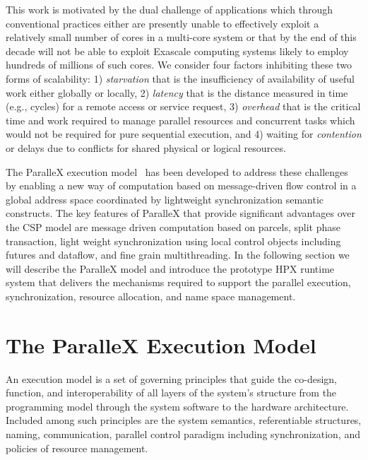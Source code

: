 \documentclass{revtex4}
\newcommand{\I}[1]{\textit{#1}}
\begin{document}
This work is motivated by the dual challenge of
applications which through conventional practices either are presently
unable to effectively exploit a relatively small number of cores in a
multi-core system or that by the end of this decade will not be able to
exploit Exascale computing systems likely to employ hundreds of millions
of such cores. We consider four factors inhibiting
these two forms of scalability: 1) \I{starvation} that is the insufficiency
of availability of useful work either globally or locally, 2) \I{latency}
that is the distance measured in time (e.g., cycles) for a remote access
or service request, 3) \I{overhead} that is the critical time and work required
to manage parallel resources and concurrent tasks which would not be
required for pure sequential execution, and 4) waiting for \I{contention} or
delays due to conflicts for shared physical or logical resources. 

  The ParalleX execution model~\cite{scaling_impaired_apps} has been developed to address these challenges by 
enabling a new way of computation based on message-driven flow control in a 
global address space coordinated by lightweight synchronization semantic constructs.
The key features of ParalleX that provide significant advantages over the CSP model
are message driven computation based on parcels, split phase transaction, 
light weight synchronization using local control objects including futures and dataflow,
and fine grain multithreading.
In the following section we will describe the ParalleX model and introduce the prototype
HPX runtime system that delivers the mechanisms required to support the parallel execution, 
synchronization, resource allocation, and name space management. 

\section{The ParalleX Execution Model}
\label{sec:hpx}

An execution model is a set of governing principles
that guide the co-design, function, and interoperability of all layers
of the system's structure from the programming model through the
system software to the hardware architecture.  Included among such 
principles are the system semantics, referentiable structures, 
naming, communication, parallel control paradigm including synchronization, 
and policies of resource management.
\end{document}
